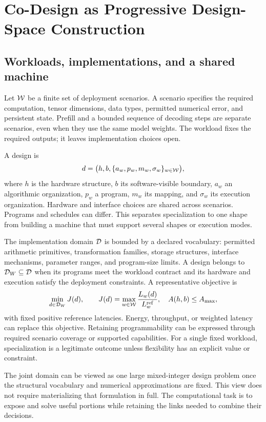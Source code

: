 \section{Co-Design as Progressive Design-Space Construction}\label{sec:space}
\subsection{Workloads, implementations, and a shared machine}
Let $\mathcal W$ be a finite set of deployment scenarios. A scenario specifies the required computation, tensor dimensions, data types, permitted numerical error, and persistent state. Prefill and a bounded sequence of decoding steps are separate scenarios, even when they use the same model weights. The workload fixes the required outputs; it leaves implementation choices open.

A design is
\begin{equation}
 d=\bigl(h,b,\{a_w,p_w,m_w,\sigma_w\}_{w\in\mathcal W}\bigr),\label{eq:design}
\end{equation}
where $h$ is the hardware structure, $b$ its software-visible boundary, $a_w$ an algorithmic organization, $p_w$ a program, $m_w$ its mapping, and $\sigma_w$ its execution organization. Hardware and interface choices are shared across scenarios. Programs and schedules can differ. This separates specialization to one shape from building a machine that must support several shapes or execution modes.

The implementation domain $\mathcal D$ is bounded by a declared vocabulary: permitted arithmetic primitives, transformation families, storage structures, interface mechanisms, parameter ranges, and program-size limits. A design belongs to $\mathcal D_W\subseteq\mathcal D$ when its programs meet the workload contract and its hardware and execution satisfy the deployment constraints. A representative objective is
\begin{equation}
 \min_{d\in\mathcal D_W} J(d),\qquad
 J(d)=\max_{w\in\mathcal W}\frac{L_w(d)}{L_w^{\mathrm{ref}}},\quad
 A(h,b)\le A_{\max},\label{eq:objective}
\end{equation}
with fixed positive reference latencies. Energy, throughput, or weighted latency can replace this objective. Retaining programmability can be expressed through required scenario coverage or supported capabilities. For a single fixed workload, specialization is a legitimate outcome unless flexibility has an explicit value or constraint.

The joint domain can be viewed as one large mixed-integer design problem once the structural vocabulary and numerical approximations are fixed. This view does not require materializing that formulation in full. The computational task is to expose and solve useful portions while retaining the links needed to combine their decisions.

